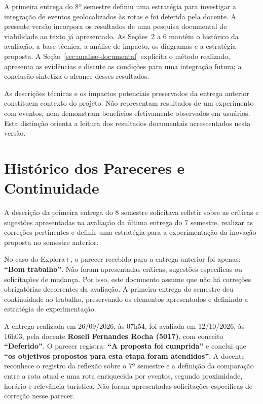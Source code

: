 \documentclass[12pt, a4paper]{article}
\begin{document}
A primeira entrega do 8º semestre definiu uma estratégia para investigar a integração de eventos geolocalizados às rotas e foi deferida pela docente. A presente versão incorpora os resultados de uma pesquisa documental de viabilidade ao texto já apresentado. As Seções~2 a 6 mantêm o histórico da avaliação, a base técnica, a análise de impacto, os diagramas e a estratégia proposta. A Seção~\ref{sec:analise-documental} explicita o método realizado, apresenta as evidências e discute as condições para uma integração futura; a conclusão sintetiza o alcance desses resultados.

As descrições técnicas e os impactos potenciais preservados da entrega anterior constituem contexto do projeto. Não representam resultados de um experimento com eventos, nem demonstram benefícios efetivamente observados em usuários. Esta distinção orienta a leitura dos resultados documentais acrescentados nesta versão.
\clearpage
\section{Histórico dos Pareceres e Continuidade}

A descri\c{c}\~ao da primeira entrega do 8\textordmasculine{} semestre solicitava refletir sobre as cr\'iticas e sugest\~oes apresentadas na avalia\c{c}\~ao da \'ultima entrega do 7\textordmasculine{} semestre, realizar as corre\c{c}\~oes pertinentes e definir uma estrat\'egia para a experimenta\c{c}\~ao da inova\c{c}\~ao proposta no semestre anterior.

No caso do Explora+, o parecer recebido para a entrega anterior foi apenas: \textbf{``Bom trabalho''}. N\~ao foram apresentadas cr\'iticas, sugest\~oes espec\'ificas ou solicita\c{c}\~oes de mudan\c{c}a. Por isso, este documento assume que n\~ao h\'a corre\c{c}\~oes obrigat\'orias decorrentes da avalia\c{c}\~ao. A primeira entrega do semestre deu continuidade ao trabalho, preservando os elementos apresentados e definindo a estrat\'egia de experimenta\c{c}\~ao.

A entrega realizada em 26/09/2026, às 07h54, foi avaliada em 12/10/2026, às 16h03, pela docente \textbf{Roseli Fernandes Rocha (5017)}, com conceito \textbf{“Deferido”}. O parecer registra: \textbf{“A proposta foi cumprida”} e conclui que \textbf{“os objetivos propostos para esta etapa foram atendidos”}. A docente reconhece o registro da reflexão sobre o 7º semestre e a definição da comparação entre a rota atual e uma rota enriquecida por eventos, segundo proximidade, horário e relevância turística. Não foram apresentadas solicitações específicas de correção nesse parecer.
\end{document}
